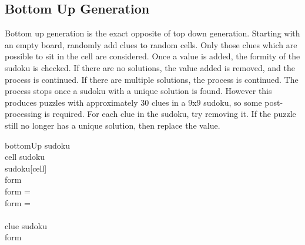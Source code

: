 \subsection{Bottom Up Generation}
Bottom up generation is the exact opposite of top down generation. Starting with an empty board, randomly add clues
to random cells. Only those clues which are possible to sit in the cell are considered. Once a value is added, the formity
of the sudoku is checked. If there are no solutions, the value added is removed, and the process is continued. If there are
multiple solutions, the process is continued. The process stops once a sudoku with a unique solution is found. However this
produces puzzles with approximately $30$ clues in a $9$x$9$ sudoku, so some post-processing is required. For each clue in the
sudoku, try removing it. If the puzzle still no longer has a unique solution, then replace the value.
\begin{center}
\begin{pseudocode}[framebox]{bottomUp}{ }
    sudoku \GETS {}                               \\
    \WHILE \TRUE \DO \BEGIN
        cell \GETS {} \in sudoku                    \\
        sudoku[cell] \GETS {}                   \\
        form \GETS {}                                 \\
        \IF form =  \THEN \EXIT {}          \\
        \IF form =  \THEN {}    \\
    \END    \\
    \FOR clue \in sudoku \DO \BEGIN
                  \\
        \IF form \neq {} \THEN
    \END                                            \\
    \label{algo:bottomup}
\end{pseudocode}
\end{center}

